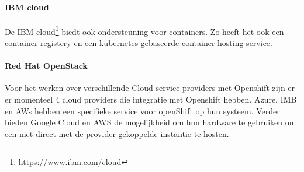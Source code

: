 \paragraph{IBM cloud}
De IBM cloud\footnote{\url{https://www.ibm.com/cloud}} biedt ook ondersteuning voor containers. Zo heeft het ook een container registery en een kubernetes gebaseerde container hosting service.
\paragraph{Red Hat OpenStack}
Voor het werken over verschillende Cloud service providers met Openshift zijn er er momenteel 4 cloud providers die integratie met Openshift hebben. Azure, IMB en AWs hebben een specifieke service voor openShift op hun systeem. Verder bieden Google Cloud en AWS de mogelijkheid om hun hardware te gebruiken om een niet direct met de provider gekoppelde instantie te hosten.



